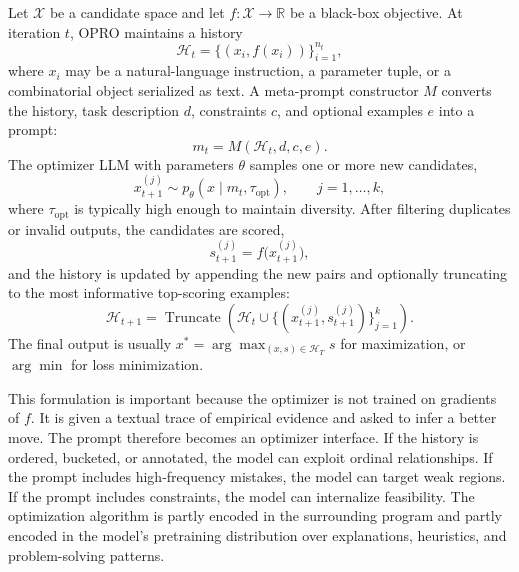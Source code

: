Let $\mathcal{X}$ be a candidate space and let $f:\mathcal{X}\rightarrow\mathbb{R}$ be a black-box objective.  At iteration $t$, OPRO maintains a history
\begin{equation}
  \mathcal{H}_t = \{(x_i, f(x_i))\}_{i=1}^{n_t},
\end{equation}
where $x_i$ may be a natural-language instruction, a parameter tuple, or a combinatorial object serialized as text.  A meta-prompt constructor $M$ converts the history, task description $d$, constraints $c$, and optional examples $e$ into a prompt:
\begin{equation}
  m_t = M(\mathcal{H}_t, d, c, e).
\end{equation}
The optimizer LLM with parameters $\theta$ samples one or more new candidates,
\begin{equation}
  x_{t+1}^{(j)} \sim p_\theta(x \mid m_t, \tau_{\mathrm{opt}}), \qquad j=1,\ldots,k,
\end{equation}
where $\tau_{\mathrm{opt}}$ is typically high enough to maintain diversity.  After filtering duplicates or invalid outputs, the candidates are scored,
\begin{equation}
  s_{t+1}^{(j)} = f\bigl(x_{t+1}^{(j)}\bigr),
\end{equation}
and the history is updated by appending the new pairs and optionally truncating to the most informative top-scoring examples:
\begin{equation}
  \mathcal{H}_{t+1} = \operatorname{Truncate}\left(\mathcal{H}_{t}\cup\{(x_{t+1}^{(j)}, s_{t+1}^{(j)})\}_{j=1}^{k}\right).
\end{equation}
The final output is usually $x^*=\arg\max_{(x,s)\in\mathcal{H}_T}s$ for maximization, or $\arg\min$ for loss minimization.

This formulation is important because the optimizer is not trained on gradients of $f$.  It is given a textual trace of empirical evidence and asked to infer a better move.  The prompt therefore becomes an optimizer interface.  If the history is ordered, bucketed, or annotated, the model can exploit ordinal relationships.  If the prompt includes high-frequency mistakes, the model can target weak regions.  If the prompt includes constraints, the model can internalize feasibility.  The optimization algorithm is partly encoded in the surrounding program and partly encoded in the model's pretraining distribution over explanations, heuristics, and problem-solving patterns.

